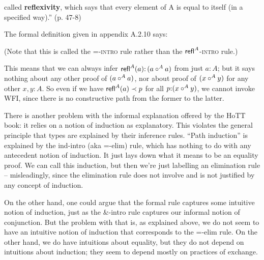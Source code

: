 \documentclass{article}
\begin{document}
called \textbf{reflexivity}, which says that every element of A is
equal to itself (in a specified way).'' (p. 47-8)

The formal definition given in appendix A.2.10 says:

\medskip


(Note that this is called the =-\textsc{intro} rule rather than
the \(\textsf{refl}^A\)-\textsc{intro} rule.)

\medskip

This means that we can always infer \(\textsf{refl}^A(a){:}\,(a\circ^A a)\) from just
\(a{:}A\); but it says nothing about any other proof of \((a\circ^A a)\),
nor about proof of \((x\circ^A y)\) for any other \(x,y{:}A\).  So even if
we have \(\textsf{refl}^A(a)\prec p\) for all \(p{:}(x\circ^A y)\), we cannot invoke WFI,
since there is no constructive path from the former to the latter.

There is another problem with the informal explanation offered by the
HoTT book: it relies on a notion of induction as explanatory.  This
violates the general principle that types are explained by their
inference rules.  ``Path induction'' is explained by the ind-intro
(aka =-elim) rule, which has nothing to do with any antecedent notion
of induction.  It just lays down what it means to be an equality
proof.  We can call this induction, but then we're just labelling an
elimination rule -- misleadingly, since the elimination rule does not
involve and is not justified by any concept of induction.

On the other hand, one could argue that the formal rule captures some
intuitive notion of induction, just as the \&-intro rule captures our
informal notion of conjunction.  But the problem with that is, as
explained above, we do not seem to have an intuitive notion of
induction that corresponds to the =-elim rule.  On the other hand, we
do have intuitions about equality, but they do not depend on
intuitions about induction; they seem to depend mostly on practices of
exchange.
\end{document}
